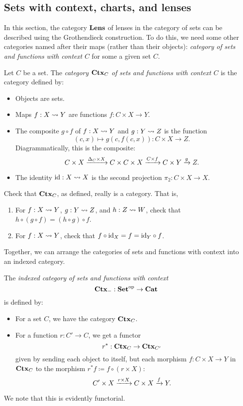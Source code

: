 \documentclass[DynamicalBook]{subfiles}
\begin{document}
\subsection{Sets with context, charts, and lenses}\label{sec.context_indexed_cat}

In this section, the category $\textbf{Lens}$ of lenses in the category of sets can be described using
the Grothendieck construction. To do this, we need some other categories named
after their maps (rather than their objects): 
\emph{category of sets and functions with context $C$} for some a given set $C$. 

\begin{definition}
  Let $C$ be a set. The \emph{category $\textbf{Ctx}_{C}$ of sets and functions with context $C$}
  is the category defined by:
  \begin{itemize}
    \item Objects are sets.
    \item Maps $f : X \rightsquigarrow Y$ are functions $f : C \times X \to Y$.
    \item The composite $g \circ f$ of $f : X \rightsquigarrow Y$ and $g : Y \rightsquigarrow Z$ is
      the function
       $$(c, x) \mapsto g(c, f(c, x)) : C \times X \to Z.$$
       Diagrammatically, this is the composite:
       $$C \times X \xrightarrow{\Delta_C \times X} C \times C \times X \xrightarrow{C \times f}
       C \times Y \xrightarrow{g} Z.$$
    \item The identity $\mathrm{id} : X \rightsquigarrow X$ is the second projection $\pi_2 : C
      \times X \to X$.
  \end{itemize}
\end{definition}

\begin{exercise}
  Check that $\textbf{Ctx}_{C}$, as defined, really is a category. That is,
  \begin{enumerate}
    \item For $f : X \rightsquigarrow Y$, $g : Y \rightsquigarrow Z$, and $h : Z \rightsquigarrow W$, check
      that $h \circ (g \circ f) = (h \circ g) \circ f$.
    \item For $f : X \rightsquigarrow Y$, check that $f \circ \mathrm{id}_X = f = \mathrm{id}_Y \circ f$.
  \end{enumerate}
\end{exercise}

Together, we can arrange the categories of sets and functions with context into
an indexed category.
\begin{definition}
  The \emph{indexed category of sets and functions with context}
  $$\textbf{Ctx}_{-} : \textbf{Set}^{\textnormal{op}} \to \textbf{Cat}$$
  is defined by:
  \begin{itemize}
    \item For a set $C$, we have the category $\textbf{Ctx}_{C}$.
    \item For a function $r : C' \to C$, we get a functor
      $$r^{\ast} : \textbf{Ctx}_{C} \to \textbf{Ctx}_{C'}$$
      given by sending each object to itself, but each morphism $f : C \times X
      \to Y$ in $\textbf{Ctx}_{C}$ to the morphism $r^{\ast}f \coloneqq f \circ (r \times X)$:
      $$C' \times X \xrightarrow{r \times X} C \times X \xrightarrow{f} Y.$$
  \end{itemize}
  We note that this is evidently functorial.
\end{definition}
\end{document}
